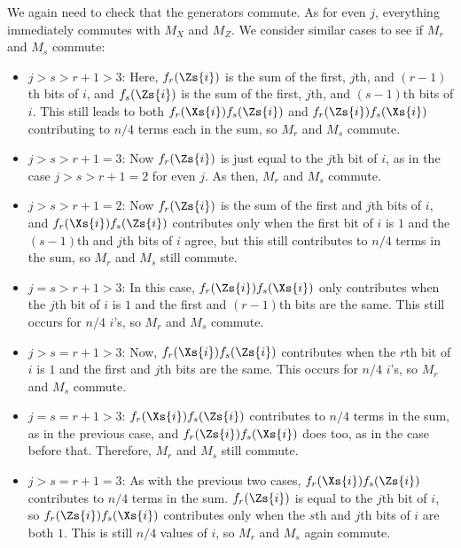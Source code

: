 We again need to check that the generators commute.  As for even $j$,
everything immediately commutes with $M_X$ and $M_Z$.  We consider
similar cases to see if $M_r$ and $M_s$ commute:
\begin{itemize}

	\item $j > s > r+1 > 3$: Here, $f_r (\Zs{i})$ is the sum of the first, $j$th,
	and $(r-1)$th bits of $i$, and $f_s (\Zs{i})$ is the sum of the first, $j$th,
	and $(s-1)$th bits of $i$.  This still leads to both $f_r (\Xs{i}) f_s (\Zs{i})$
	and $f_r (\Zs{i}) f_s (\Xs{i})$ contributing to $n/4$ terms each in the sum, so
	$M_r$ and $M_s$ commute.

	\item $j > s > r+1 = 3$: Now $f_r (\Zs{i})$ is just equal to the $j$th bit of
	$i$, as in the case $j > s > r+1 = 2$ for even $j$.  As then, $M_r$ and $M_s$
	commute.

	\item $j > s > r+1 = 2$: Now $f_r (\Zs{i})$ is the sum of the first and $j$th
	bits of $i$, and $f_r (\Xs{i}) f_s (\Zs{i})$ contributes only when the first
	bit of $i$ is $1$ and the $(s-1)$th and $j$th bits of $i$ agree, but this still
	contributes to $n/4$ terms in the sum, so $M_r$ and $M_s$ still commute.

	\item $j = s > r+1 > 3$: In this case, $f_r (\Zs{i}) f_s (\Xs{i})$ only
	contributes when the $j$th bit of $i$ is $1$ and the first and $(r-1)$th bits
	are the same.  This still occurs for $n/4$ $i$'s, so $M_r$ and $M_s$ commute.

	\item $j > s = r+1 > 3$: Now, $f_r (\Xs{i}) f_s (\Zs{i})$ contributes when the
	$r$th bit of $i$ is $1$ and the first and $j$th bits are the same.  This
	occurs for $n/4$ $i$'s, so $M_r$ and $M_s$ commute.

	\item $j = s = r+1 > 3$: $f_r (\Xs{i}) f_s (\Zs{i})$ contributes to $n/4$ terms
	in the sum, as in the previous case, and $f_r (\Zs{i}) f_s (\Xs{i})$ does too,
	as in the case before that.  Therefore, $M_r$ and $M_s$ still commute.

	\item $j > s = r+1 = 3$: As with the previous two cases, $f_r (\Xs{i}) f_s
	(\Zs{i})$ contributes to $n/4$ terms in the sum.  $f_r (\Zs{i})$ is equal to
	the $j$th bit of $i$, so $f_r (\Zs{i}) f_s (\Xs{i})$ contributes only when the
	$s$th and $j$th bits of $i$ are both $1$. This is still $n/4$ values of $i$, so
	$M_r$ and $M_s$ again commute.


\end{itemize}
